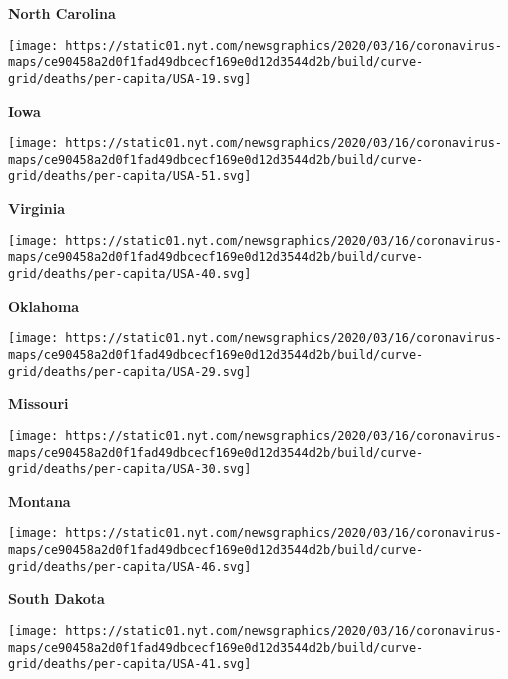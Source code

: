 \textbf{North Carolina}

\href{https://www.nytimes.com/interactive/2020/us/iowa-coronavirus-cases.html}{}

\texttt{[image: https://static01.nyt.com/newsgraphics/2020/03/16/coronavirus-maps/ce90458a2d0f1fad49dbcecf169e0d12d3544d2b/build/curve-grid/deaths/per-capita/USA-19.svg]}

\textbf{Iowa}

\href{https://www.nytimes.com/interactive/2020/us/virginia-coronavirus-cases.html}{}

\texttt{[image: https://static01.nyt.com/newsgraphics/2020/03/16/coronavirus-maps/ce90458a2d0f1fad49dbcecf169e0d12d3544d2b/build/curve-grid/deaths/per-capita/USA-51.svg]}

\textbf{Virginia}

\href{https://www.nytimes.com/interactive/2020/us/oklahoma-coronavirus-cases.html}{}

\texttt{[image: https://static01.nyt.com/newsgraphics/2020/03/16/coronavirus-maps/ce90458a2d0f1fad49dbcecf169e0d12d3544d2b/build/curve-grid/deaths/per-capita/USA-40.svg]}

\textbf{Oklahoma}

\href{https://www.nytimes.com/interactive/2020/us/missouri-coronavirus-cases.html}{}

\texttt{[image: https://static01.nyt.com/newsgraphics/2020/03/16/coronavirus-maps/ce90458a2d0f1fad49dbcecf169e0d12d3544d2b/build/curve-grid/deaths/per-capita/USA-29.svg]}

\textbf{Missouri}

\href{https://www.nytimes.com/interactive/2020/us/montana-coronavirus-cases.html}{}

\texttt{[image: https://static01.nyt.com/newsgraphics/2020/03/16/coronavirus-maps/ce90458a2d0f1fad49dbcecf169e0d12d3544d2b/build/curve-grid/deaths/per-capita/USA-30.svg]}

\textbf{Montana}

\href{https://www.nytimes.com/interactive/2020/us/south-dakota-coronavirus-cases.html}{}

\texttt{[image: https://static01.nyt.com/newsgraphics/2020/03/16/coronavirus-maps/ce90458a2d0f1fad49dbcecf169e0d12d3544d2b/build/curve-grid/deaths/per-capita/USA-46.svg]}

\textbf{South Dakota}

\href{https://www.nytimes.com/interactive/2020/us/oregon-coronavirus-cases.html}{}

\texttt{[image: https://static01.nyt.com/newsgraphics/2020/03/16/coronavirus-maps/ce90458a2d0f1fad49dbcecf169e0d12d3544d2b/build/curve-grid/deaths/per-capita/USA-41.svg]}

